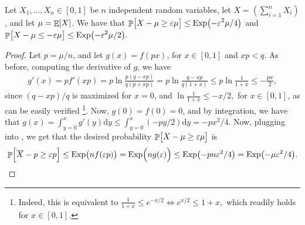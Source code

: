 \begin{theorem}
    Let $X_1, \ldots, X_n \in [0,1]$ be $n$ independent random
    variables, let $X= (\sum_{i=1}^n X_i)$, and let $\mu = \mathop{\mathbb{E}}\!\left[ {X} \right]$. We
    have that
    \begin{math}%
        \ds%
        \Prob{\bigl.{X} - \mu \geq \eps \mu }%
        \leq%
        \Exp\pth{ -\eps^2 \mu / 4}
    \end{math}
    and 
    \begin{math}%
        \ds%
        \Prob{\bigl. X - \mu \leq -\eps \mu }%
        \leq%
        \Exp\pth{ - \eps^2 \mu/2}.
    \end{math}
\end{theorem}
\begin{proof}
    Let $p = \mu /n$, and let $g(x) = f(px)$, for $x \in [0,1]$ and
    $xp < q$. As before, computing the derivative of $g$, we have
    \begin{align*}
        g'(x)%
        =%
        p f'(xp)%
        =%
        p\ln \frac{p(q-xp)}{q(p+xp)} %
        =%
        p\ln \frac{q-xp}{q(1+x)} %
        \leq%
        p\ln \frac{1}{1+x}%
        \leq%
        - \frac{px}{2}, %
    \end{align*}
    since $(q-xp)/q$ is maximized for $x=0$, and
    \begin{math}
        \ln \frac{1}{1+x} \leq -x/2,
    \end{math}
    for $x \in [0,1]$, as can be easily verified%
    \footnote{Indeed, this is equivalent to
       \begin{math}
           \frac{1}{1+x} \leq e^{-x/2}%
           \iff%
           e^{x/2} \leq 1+x,
       \end{math}
       which readily holds for $x \in [0,1]$.%
    }. %
    Now, $g(0) =f (0) = 0$, and by integration, we have that
    \begin{math}
        g(x) =%
        \int_{y=0}^x g'(y) \mathrm{d} y %
        \leq%
        \int_{y=0}^x (-py/2) \mathrm{d} y %
        = -px^2/4.
    \end{math}
    Now, plugging into , we get
    that the desired probability 
    \begin{math}
        \Prob{\bigl.{X} - \mu \geq \eps \mu }%
    \end{math}
    is %
    \begin{align*}%
        \ds%
        \Prob{\Bigl.\overline{X} - p \geq \eps p }%
        \leq%
        \Exp\pth{ \bigl. nf(\eps p)} = \Exp\pth{ \Bigl. n g(\eps)}
        \leq%
        \Exp\pth{ \bigl. - p n\eps^2 /4}%
        =%
        \Exp\pth{ \bigl. - \mu\eps^2 /4}.
    \end{align*}
    

\end{proof}
